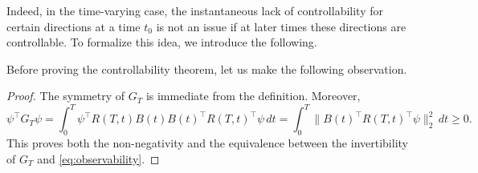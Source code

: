 Indeed, in the time-varying case, the instantaneous lack of controllability for certain directions at a time $t_0$ is not an issue if at later times these directions are controllable. To formalize this idea, we introduce the following.


Before proving the controllability theorem, let us make the following observation.


\begin{proof}
    The symmetry of $G_T$ is immediate from the definition. Moreover,
    \begin{equation}
        \psi^\top G_T \psi = \int_0^T \psi^\top R(T,t)B(t) B(t)^\top R(T,t)^\top \psi\, dt = \int_0^T \|B(t)^\top R(T,t)^\top \psi\|_2^2 \, dt \ge 0.
    \end{equation}
    This proves both the non-negativity and the equivalence between the invertibility of $G_T$ and \eqref{eq:observability}.
\end{proof}


